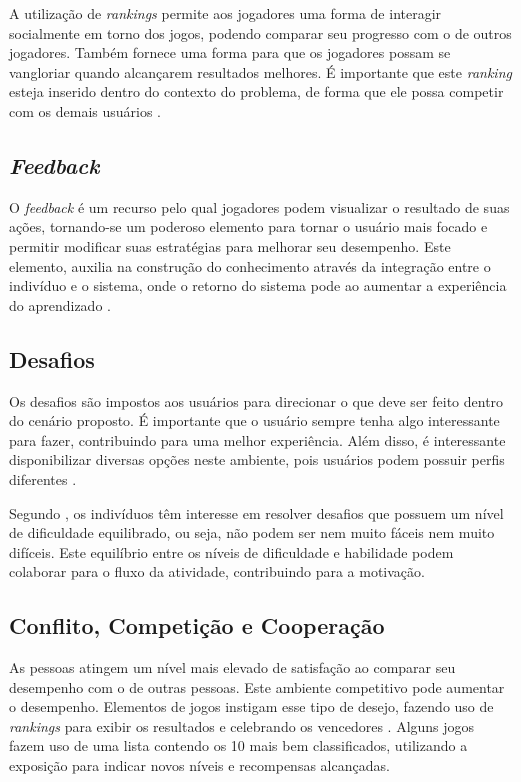 \documentclass[
	12pt,				%
	oneside,			%
	a4paper,			%
	english,			%
	french,				%
	spanish,			%
	brazil,				%
	]{abntex2}
\begin{document}
A utilização de \textit{rankings} permite aos jogadores uma forma de interagir socialmente em torno dos jogos, podendo comparar seu progresso com o de outros jogadores. Também fornece uma forma para que os jogadores possam se vangloriar quando alcançarem resultados melhores. É importante que este \textit{ranking} esteja inserido dentro do contexto do problema, de forma que ele possa competir com os demais usuários \cite{quadros2016gamificaccao}.
    
\subsection{\textit{Feedback}}            

O \textit{feedback} é um recurso pelo qual jogadores podem visualizar o resultado de suas ações, tornando-se um poderoso elemento para tornar o usuário mais focado e permitir modificar suas estratégias para melhorar seu desempenho. Este elemento, auxilia na construção do conhecimento através da integração entre o indivíduo e o sistema, onde o retorno do sistema pode ao aumentar a experiência do aprendizado \cite{fardo2013gamificaccao}.
    
\subsection{Desafios}                

Os desafios são impostos aos usuários para direcionar o que deve ser feito dentro do cenário proposto. É importante que o usuário sempre tenha algo interessante para fazer, contribuindo para uma melhor experiência. Além disso, é interessante disponibilizar diversas opções neste ambiente, pois usuários podem possuir perfis diferentes \cite{fardo2013gamificaccao}.

Segundo \citet{busarello2016gamificaccao}, os indivíduos têm interesse em resolver desafios que possuem um nível de dificuldade equilibrado, ou seja, não podem ser nem muito fáceis nem muito difíceis. Este equilíbrio entre os níveis de dificuldade e habilidade podem colaborar para o fluxo da atividade, contribuindo para a motivação.
    
\subsection{Conflito, Competição e Cooperação}                    

As pessoas atingem um nível mais elevado de satisfação ao comparar seu desempenho com o de outras pessoas. Este ambiente competitivo pode aumentar o desempenho. Elementos de jogos instigam esse tipo de desejo, fazendo uso de \textit{rankings} para exibir os resultados e celebrando os vencedores  \cite{bunchball2016gamification}. Alguns jogos fazem uso de uma lista contendo os 10 mais bem classificados, utilizando a exposição para indicar novos níveis e recompensas alcançadas.
\end{document}
